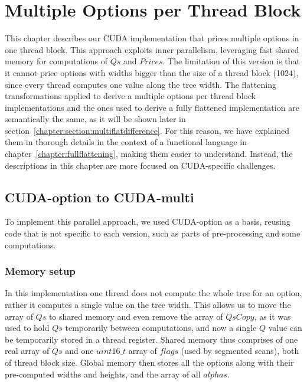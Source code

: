 \chapter{Multiple Options per Thread Block}
\label{chapter:multoptionsperthreadblock}
This chapter describes our CUDA implementation that prices multiple options in one thread block. This approach exploits inner parallelism, leveraging fast shared memory for computations of $\mathit{Qs}$ and $\mathit{Prices}$. The limitation of this version is that it cannot price options with widths bigger than the size of a thread block (1024), since every thread computes one value along the tree width. The flattening transformations applied to derive a multiple options per thread block implementations and the ones used to derive a fully flattened implementation are semantically the same, as it will be shown later in section~\ref{chapter:section:multiflatdifference}. For this reason, we have explained them in thorough details in the context of a functional language in chapter~\ref{chapter:fullflattening}, making them easier to understand. Instead, the descriptions in this chapter are more focused on CUDA-specific challenges.

\section{CUDA-option to CUDA-multi}
To implement this parallel approach, we used CUDA-option as a basis, reusing code that is not specific to each version, such as parts of pre-processing and some computations.

\subsection{Memory setup}
In this implementation one thread does not compute the whole tree for an option, rather it computes a single value on the tree width. This allows us to move the array of $\mathit{Qs}$ to shared memory and even remove the array of $\mathit{QsCopy}$, as it was used to hold $\mathit{Qs}$ temporarily between computations, and now a single $Q$ value can be temporarily stored in a thread register. Shared memory thus comprises of one real array of $\mathit{Qs}$ and one $uint16\_t$ array of $\mathit{flags}$ (used by segmented scans), both of thread block size. Global memory then stores all the options along with their pre-computed widths and heights, and the array of all $\mathit{alphas}$.

